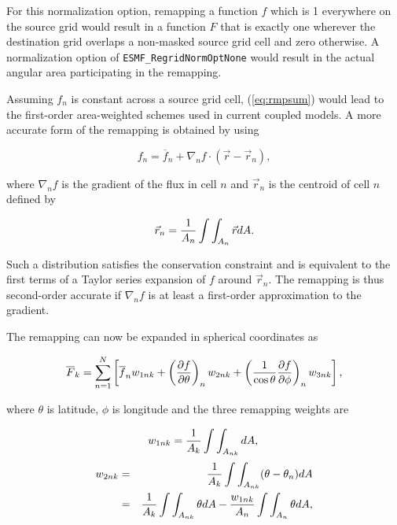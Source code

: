 \begin{description}
     For this normalization option, remapping a function $f$ which is 1
     everywhere on the source grid would result in a function $F$ that is
     exactly one wherever the destination grid overlaps a non-masked source
     grid cell and zero otherwise.  A normalization option of
     {\tt ESMF\_RegridNormOptNone} would result in the actual angular area
     participating in the remapping.

     Assuming $f_n$ is constant across a source grid cell, (\ref{eq:rmpsum})
     would lead to the first-order area-weighted schemes used in current coupled
     models.  A more accurate form of the remapping is obtained by using 

\begin{equation}\label{eq:gradient}
f_n = \overline{f}_n + 
                   \nabla_n f\cdot({\vec{r}} - \vec{r}_n),
\end{equation}

     where $\nabla_n f$ is the gradient of the flux in cell $n$ and $\vec{r}_n$
     is the centroid of cell $n$ defined by

 \begin{equation}\label{eq:centroid}
\vec{r}_n = {1\over{A_n}}\int\int_{A_n}\vec{r}dA.
\end{equation}

     Such a distribution satisfies the conservation constraint and is equivalent
     to the first terms of a Taylor series expansion of $f$ around $\vec{r}_n$.
     The remapping is thus second-order accurate if $\nabla_n f$ is at least a 
     first-order approximation to the gradient.

     The remapping can now be expanded in spherical coordinates as 

\begin{equation}\label{eq:remap}
\overline{F}_k = \sum_{n=1}^{N} \left[\overline{f}_n w_{1nk} + 
\left({{\partial f}\over{\partial \theta}}\right)_n w_{2nk} +
\left({1\over{\cos\theta}}{{\partial f}\over{\partial \phi}}\right)_n w_{3nk}
\right],
\end{equation}

     where $\theta$ is latitude, $\phi$ is longitude and the three remapping
     weights are

\begin{equation}\label{eq:weights1}
w_{1nk} = {1\over{A_k}}\int\int_{A_{nk}}dA, \\
\end{equation}
\begin{eqnarray}\label{eq:weights2}
w_{2nk} & = & {1\over{A_k}}\int\int_{A_{nk}}(\theta-\theta_n)dA \nonumber \\
        & = & {1\over{A_k}}\int\int_{A_{nk}}\theta dA -
              {{w_{1nk}}\over{A_n}}\int\int_{A_n}\theta dA,
\end{eqnarray}


\end{description}
